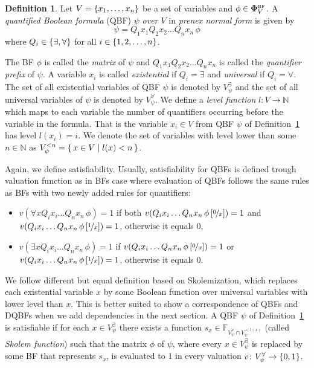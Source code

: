 \documentclass[
  digital, %
  color,
  twoside, %
  table,   %
  nolof,     %
  nolot,     %
]{fithesis3}
\let\setbuilder\set
\newcommand{\simpleset}[1]{\{{#1}\}}
\renewcommand{\set}[1]{\normalexpandarg\IfSubStr{#1}{|}{\setbuilder{#1}}{\simpleset{#1}}}
\theoremstyle{definition}
\newtheorem{definition}{Definition}
\theoremstyle{remark}
\newcommand{\substitute}[2]{\left[ \nicefrac{#2}{#1} \right]}
\newcommand{\BF}[1]{\mathbf{\Phi}_{#1}^{\normalfont{\text{\tiny BF}}}}
\newcommand{\BFuncs}[1]{\mathbb{F}_{#1}}
\newcommand{\evars}[1]{V_{#1}^{\exists}}
\newcommand{\uvars}[1]{V_{#1}^{\forall}}
\newcommand{\itholds}{\,}
\begin{document}
\begin{definition}
Let $V = \set{x_1,\dots,x_n}$ be a set of variables and $\phi \in \BF{V}$. A \emph{quantified Boolean formula} (QBF) $\psi$ \emph{over $V$} in \emph{prenex normal form} is given by
\[\psi = Q_1 x_1 Q_2 x_2 \dots Q_n x_n \itholds \phi\]
where $Q_i \in \set{{\exists}, {\forall}}$ for all $i \in \set{1,2,\dots,n}$.
\label{def:QBF}
\end{definition}

The BF $\phi$ is called the \emph{matrix} of $\psi$ and $Q_1 x_1 Q_2 x_2 \dots Q_n x_n$ is called the \emph{quantifier prefix} of $\psi$. A variable $x_i$ is called \emph{existential} if $Q_i = \exists$ and \emph{universal} if $Q_i = \forall$. The set of all existential variables of QBF $\psi$ is denoted by $\evars{\psi}$ and the set of all universal variables of $\psi$ is denoted by $\uvars{\psi}$. We define a \emph{level function} $l\colon V \to \mathbb{N}$ which maps to each variable the number of quantifiers occurring before the variable in the formula. That is the variable $x_i \in V$ from QBF $\psi$ of Definition~\ref{def:QBF} has level $l(x_i) = i$. We denote the set of variables with level lower than some $n \in \mathbb{N}$ as $V_{\psi}^{<n} = \set{x \in V | l(x) < n}$.

\begin{sloppypar}
Again, we define satisfiability. Usually, satisfiability for QBFs is defined trough valuation function as in BFs case where evaluation of QBFs follows the same rules as BFs with two newly added rules for quantifiers:
\begin{itemize}
    \item $v(\forall x Q_i x_i \dots Q_n x_n \itholds \phi) = 1$ if both $v(Q_i x_i \dots Q_n x_n \itholds \phi\substitute{x}{0}) = 1$ and $v(Q_i x_i \dots Q_n x_n \itholds \phi\substitute{x}{1}) = 1$, otherwise it equals $0$,
    \item $v(\exists x Q_i x_i \dots Q_n x_n \itholds \phi) = 1$ if $v(Q_i x_i \dots Q_n x_n \itholds \phi\substitute{x}{0}) = 1$ or $v(Q_i x_i \dots Q_n x_n \itholds \phi\substitute{x}{1}) = 1$, otherwise it equals $0$.
\end{itemize}
\end{sloppypar}
We follow different but equal definition based on Skolemization, which replaces each existential variable $x$ by some Boolean function over universal variables with lower level than $x$. This is better suited to show a correspondence of QBFs and DQBFs when we add dependencies in the next section. A QBF $\psi$ of Definition~\ref{def:QBF} is satisfiable if for each $x \in V_{\psi}^{\exists}$ there exists a function $s_{x} \in \BFuncs{\uvars{\psi}\cap V_{\psi}^{<l(x)}}$ (called \emph{Skolem function}) such that the matrix $\phi$ of $\psi$, where every $x \in \evars{\psi}$ is replaced by some BF that represents $s_x$, is evaluated to $1$ in every valuation $v\colon \uvars{\psi} \to \set{0,1}$.
\end{document}
